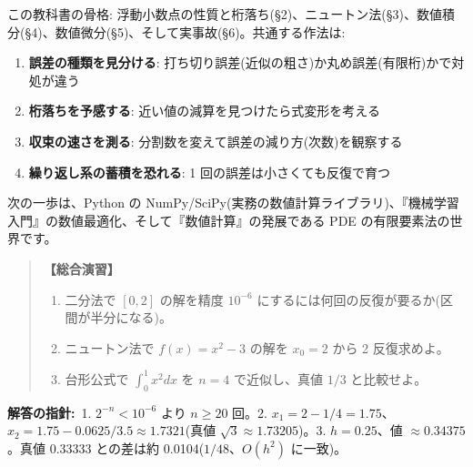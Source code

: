\documentclass{article}
\begin{document}
この教科書の骨格: 浮動小数点の性質と桁落ち(§2)、ニュートン法(§3)、数値積分(§4)、数値微分(§5)、そして実事故(§6)。共通する作法は:

\begin{enumerate}
\item \textbf{誤差の種類を見分ける}: 打ち切り誤差(近似の粗さ)か丸め誤差(有限桁)かで対処が違う
\item \textbf{桁落ちを予感する}: 近い値の減算を見つけたら式変形を考える
\item \textbf{収束の速さを測る}: 分割数を変えて誤差の減り方(次数)を観察する
\item \textbf{繰り返し系の蓄積を恐れる}: 1 回の誤差は小さくても反復で育つ
\end{enumerate}

次の一歩は、Python の NumPy/SciPy(実務の数値計算ライブラリ)、『機械学習入門』の数値最適化、そして『数値計算』の発展である PDE の有限要素法の世界です。

\begin{quote}
\textbf{【総合演習】}
\begin{enumerate}
\item 二分法で \([0, 2]\) の解を精度 \(10^{-6}\) にするには何回の反復が要るか(区間が半分になる)。
\item ニュートン法で \(f(x) = x^2 - 3\) の解を \(x_0 = 2\) から 2 反復求めよ。
\item 台形公式で \(\int_0^1 x^2 dx\) を \(n = 4\) で近似し、真値 \(1/3\) と比較せよ。
\end{enumerate}
\end{quote}

\textbf{解答の指針:}\ 1. \(2^{-n} < 10^{-6}\) より \(n \ge 20\) 回。2. \(x_1 = 2 - 1/4 = 1.75\)、\(x_2 = 1.75 - 0.0625/3.5 \approx 1.7321\)(真値 \(\sqrt{3} \approx 1.73205\))。3. \(h = 0.25\)、値 \(\approx 0.34375\)。真値 0.33333 との差は約 0.0104(\(1/48\)、\(O(h^2)\) に一致)。
\end{document}
